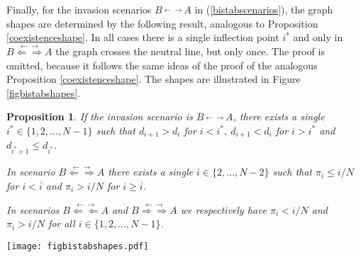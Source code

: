 \documentclass[12pt]{article}
\newtheorem{proposition}{Proposition}
\begin{document}
Finally, for the invasion scenarios $B\stackrel{\leftarrow \rightarrow}{} A$ in (\ref{bistabscenarios}), the graph shapes are determined by the following result, analogous to Proposition \ref{coexistenceshape}. In all cases there is a single inflection point $i^{\ast}$ and only in $B\stackrel{\leftarrow \rightarrow}{\Leftarrow \Rightarrow} A$ the graph crosses the neutral line, but only once. The proof is omitted, because it follows the same ideas of the proof of the analogous Proposition \ref{coexistenceshape}. The shapes are illustrated in Figure \ref{figbistabshapes}.

\begin{proposition}  \label{coordinationshape}
	If the invasion scenario is $B\stackrel{\leftarrow \rightarrow}{} A$, there exists a single $i^{\ast} \in  \{1, 2, \dots, N-1\}$ such that $d_{i+1}> d_i$ for $i <i^{\ast}$, $d_{i+1}< d_i$ for $i >i^{\ast}$ and $d_{i^{\ast}+1} \leq d_{i^{\ast}}$.	
	
	In scenario $B\stackrel{\leftarrow \rightarrow}{\Leftarrow \Rightarrow} A$ there exists a single $\overline{i} \in \{2, \dots, N-2\}$ such that $\pi_i \leq i/N$ for $i < \overline{i}$ and $\pi_i > i/N$ for $i \geq \overline{i}$.
	
	In scenarios $B\stackrel{\leftarrow \rightarrow}{\Leftarrow \Leftarrow} A$ and $B\stackrel{\leftarrow \rightarrow}{\Rightarrow \Rightarrow} A$ we respectively have $\pi_i<i/N$ and $\pi_i>i/N$ for all $i \in \{1,2, \dots, N-1\}$.
\end{proposition}

\begin{figure*}
	\texttt{[image: figbistabshapes.pdf]}
	\caption{Plot of the fixation probability of A as a function of the initial fraction $i/N$ of A individuals in the population for two values of the population size. The neutral case graph $\pi_i=i/N$ is shown for comparison. The pay-off matrix elements are $a=2.3$, $b= 1.89$, $c=2.2$ and $d= 2.1$ and the selection intensity is $w=1$.
		For both values $N=100$ and $N=300$ it is easy to check that $r_1<1$ and $r_{N-1}>1$. For $N=100$ we have $\rho_A<1/N$ and $\rho_B>1/N$ and the evolutionary scenario is $B\stackrel{\leftarrow \rightarrow}{\Leftarrow \Leftarrow} A$. But for $N=300$ we have $\rho_A<1/N$ and $\rho_B<1/N$, so that the evolutionary scenario is $B\stackrel{\leftarrow \rightarrow}{\Leftarrow \Rightarrow} A$.}
	\label{figbistabshapes}     %
\end{figure*}
\end{document}

